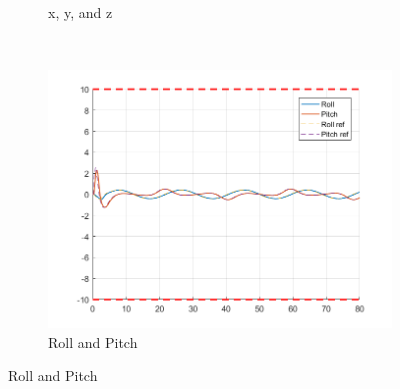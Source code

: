 \documentclass[11pt]{article}
\begin{document}
\begin{enumerate}
\begin{figure}[ht]
\begin{subfigure}[c]{0.3\linewidth}
            \caption{x, y, and z}
        \end{subfigure}
        ~
        \begin{subfigure}[c]{0.3\linewidth}
            \centering
            \includegraphics[width=\linewidth]{Plots_13_NonlinearModel_Lemniscate/03}
            \caption{Roll and Pitch}
        \end{subfigure}
        

\end{figure}
\end{enumerate}
\end{document}
